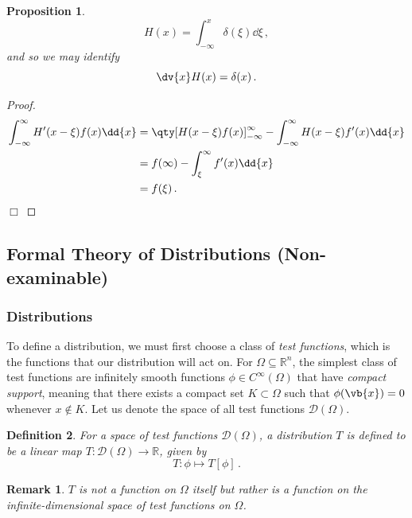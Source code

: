 \documentclass{article}
\theoremstyle{plain}\theoremheaderfont{\normalfont\itshape}\theorembodyfont{\rmfamily}\theoremseparator{.}\newtheorem*{rem}{Remark}\newtheorem*{ex}{Example}\newtheorem*{proof}{Proof}\newtheorem*{altp}{Alternative proof}
\theoremstyle{plain}\theoremheaderfont{\normalfont\bfseries}\theorembodyfont{\rmfamily}\theoremseparator{.}\newtheorem{thm}{Theorem}[section]\newtheorem{lem}[thm]{Lemma}\newtheorem{prop}[thm]{Proposition}\newtheorem*{cor}{Corollary}\newtheorem{defn}[thm]{Definition}\newtheorem{clm}[thm]{Claim}\newtheorem{clminproof}{Claim}
\theoremstyle{break}\theoremheaderfont{\normalfont\itshape}\theorembodyfont{\rmfamily}\theoremseparator{.\medskip}\newtheorem*{proofskip}{Proof}\newtheorem*{exs}{Examples}\newtheorem*{rems}{Remarks}
\theoremstyle{break}\theoremheaderfont{\normalfont\bfseries}\theorembodyfont{\rmfamily}\theoremseparator{.\medskip}\newtheorem{lemskip}[thm]{Lemma}\newtheorem{defnskip}[thm]{Definition}\newtheorem{propskip}[thm]{Proposition}\newtheorem{thmskip}[thm]{Theorem}
\numberwithin{equation}{section}
\newcommand{\qed}{\hfill\ensuremath{\Box}}
\begin{document}
	\begin{prop}
		\[H(x)=\int_{-\infty}^{x}\delta(\xi)\dd{\xi}\,,\]
		and so we may identify
		\[\dv{x} H(x)=\delta(x)\,.\]
	\end{prop}

	\begin{proof}
		\begin{align*}
			\int_{-\infty}^{\infty}H'(x-\xi)f(x)\dd{x}&=\qty[H(x-\xi)f(x)]^{\infty}_{-\infty}-\int_{-\infty}^{\infty}H(x-\xi)f'(x)\dd{x}\\
			&=f(\infty)-\int_{\xi}^{\infty}f'(x)\dd{x}\\
			&=f(\xi)\,.
		\end{align*}\qed
	\end{proof}

	\subsection{Formal Theory of 
	Distributions (Non-examinable)}
	\subsubsection{Distributions}
	To define a distribution, we must first choose a class of \textit{test functions}, which is the functions that our distribution will act on. For \(\Omega\subseteq\mathbb{R}^n\), the simplest class of test functions are infinitely smooth functions \(\phi\in C^\infty(\Omega)\) that have \textit{compact support}, meaning that there exists a compact set \(K\subset\Omega\) such that \(\phi(\vb{x})=0\) whenever \(x\notin K\). Let us denote the space of all test functions \(\mathcal{D}(\Omega)\).
	\begin{defn}
		For a space of test functions \(\mathcal{D}(\Omega)\), a \textit{distribution} \(T\) is defined to be a linear map \(T:\mathcal{D}(\Omega)\to\mathbb{R}\), given by
		\[T:\phi\mapsto T[\phi]\,.\]
	\end{defn}
	\begin{rem}
		\(T\) is not a function on \(\Omega\) itself but rather is a function on the infinite-dimensional space of test functions on \(\Omega\).
	\end{rem}
\end{document}

